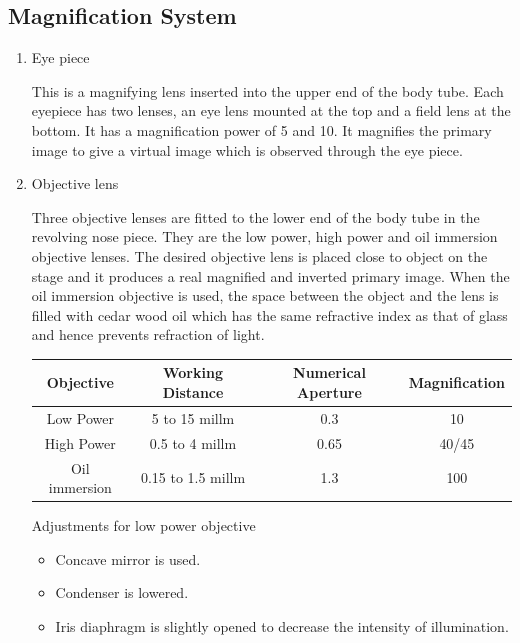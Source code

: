 \documentclass[a4paper,12pt]{book}
\begin{document}
						\subsection*{Magnification System}
						\begin{enumerate}

							\item{Eye piece
								\par This is a magnifying lens inserted into the upper end of the body tube. Each eyepiece has two lenses, an eye lens mounted at the top and a field lens at the bottom. It has a magnification power of 5 and 10. It magnifies the primary image to give a virtual image which is observed through the eye piece.}
							\item{Objective lens

								\par Three objective lenses are fitted to the lower end of the body tube in the revolving nose piece. They are the low power, high power and oil immersion objective lenses. The desired objective lens is placed close to object on the stage and it produces a real magnified and inverted primary image. When the oil immersion objective is used, the space between the object and the lens is filled with cedar wood oil which has the same refractive index as that of glass and hence prevents refraction of light.\newline
									\begin{tabular}{c | c | c | c}
										\hline
										Objective & Working Distance & Numerical Aperture &Magnification\\
										\hline
										Low Power & 5 to 15 millm & 0.3 & 10\\
										\hline
										High Power
										&0.5 to 4 millm
										&0.65
										&40/45 \\
										\hline

										Oil immersion
										&0.15 to 1.5 millm
										&1.3
										&100 \\

										\hline





									\end{tabular}

								\par
									Adjustments for low power objective
									\begin{itemize}
										\item {Concave mirror is used.}
										\item {Condenser is lowered.}
										\item {Iris diaphragm is slightly opened to decrease the intensity of illumination.}
									\end{itemize}

}
\end{enumerate}
\end{document}
